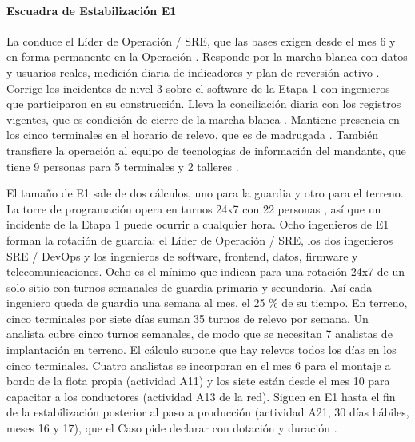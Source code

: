 
\paragraph{Escuadra de Estabilización E1}
La conduce el Líder de Operación / SRE, que las bases exigen desde el mes 6 y en forma permanente en
la Operación . Responde por la marcha blanca con datos y usuarios reales,
medición diaria de indicadores y plan de reversión activo . Corrige los incidentes de
nivel 3 sobre el software de la Etapa 1 con ingenieros que participaron en su construcción. Lleva la
conciliación diaria con los registros vigentes, que es condición de cierre de la marcha blanca
. Mantiene presencia en los cinco terminales en el horario de relevo, que es de
madrugada . También transfiere la operación al equipo de tecnologías de información
del mandante, que tiene 9 personas para 5 terminales y 2 talleres .

El tamaño de E1 sale de dos cálculos, uno para la guardia y otro para el terreno. La torre de
programación opera en turnos 24x7 con 22 personas , así que un incidente de la
Etapa 1 puede ocurrir a cualquier hora. Ocho ingenieros de E1 forman la rotación de guardia: el Líder
de Operación / SRE, los dos ingenieros SRE / DevOps y los ingenieros de software, frontend, datos,
firmware y telecomunicaciones. Ocho es el mínimo que \textcite{beyer2016} indican para una rotación
24x7 de un solo sitio con turnos semanales de guardia primaria y secundaria. Así cada ingeniero queda
de guardia una semana al mes, el 25 \% de su tiempo. En terreno, cinco terminales por siete días
suman 35 turnos de relevo por semana. Un analista cubre cinco turnos semanales, de modo que se
necesitan 7 analistas de implantación en terreno. El cálculo supone que hay relevos todos los días en
los cinco terminales. Cuatro analistas se incorporan en el mes 6 para el montaje a bordo de la flota propia (actividad A11)
y los siete están desde el mes 10 para capacitar a los conductores (actividad A13 de la red). Siguen en E1 hasta el fin de la estabilización posterior al paso a
producción (actividad A21, 30 días hábiles, meses 16 y 17), que el Caso pide declarar con dotación y
duración .

